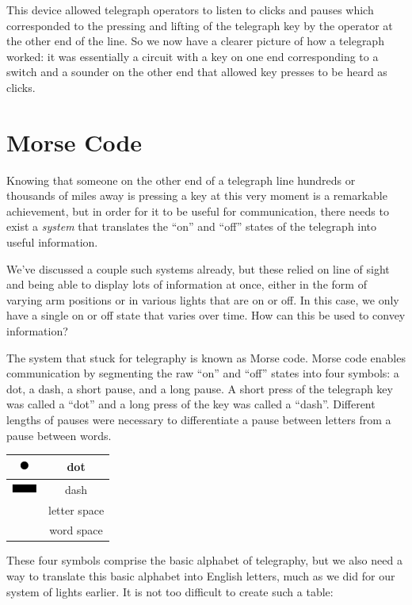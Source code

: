 \documentclass[UTF8]{book}
\newcommand*\thickdash{\includegraphics{thick-dash2}}
\newcommand*\thickdot{\includegraphics{thick-dot2}}
\begin{document}
\begin{CJK}{UTF8}{gbsn}
This device allowed telegraph operators to listen to clicks and pauses which corresponded to the pressing and lifting of the telegraph key by the operator at the other end of the line. So we now have a clearer picture of how a telegraph worked: it was essentially a circuit with a key on one end corresponding to a switch and a sounder on the other end that allowed key presses to be heard as clicks.

\section{Morse Code}

Knowing that someone on the other end of a telegraph line hundreds or thousands of miles away is pressing a key at this very moment is a remarkable achievement, but in order for it to be useful for communication, there needs to exist a \emph{system} that translates the ``on'' and ``off'' states of the telegraph into useful information.

We've discussed a couple such systems already, but these relied on line of sight and being able to display lots of information at once, either in the form of varying arm positions or in various lights that are on or off. In this case, we only have a single on or off state that varies over time. How can this be used to convey information?

The system that stuck for telegraphy is known as Morse code. Morse code enables communication by segmenting the raw ``on'' and ``off'' states into four symbols: a dot, a dash, a short pause, and a long pause. A short press of the telegraph key was called a ``dot'' and a long press of the key was called a ``dash''. Different lengths of pauses were necessary to differentiate a pause between letters from a pause between words.

\begin{center}
\begin{tabular}{cc}
\thickdot & dot \\
\hline
\thickdash & dash \\
\hline
[short pause] & letter space \\
\hline
[long pause] & word space \\
\end{tabular}
\end{center}

These four symbols comprise the basic alphabet of telegraphy, but we also need a way to translate this basic alphabet into English letters, much as we did for our system of lights earlier. It is not too difficult to create such a table:


\end{CJK}
\end{document}
